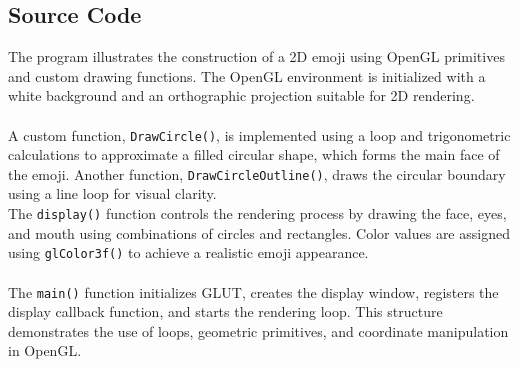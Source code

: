 \documentclass[12pt]{article}
\begin{document}
\subsection{Source Code}
The program illustrates the construction of a 2D emoji using OpenGL primitives and custom drawing functions. The OpenGL environment is initialized with a white background and an orthographic projection suitable for 2D rendering. \\ \\
A custom function, \texttt{DrawCircle()}, is implemented using a loop and trigonometric calculations to approximate a filled circular shape, which forms the main face of the emoji. Another function, \texttt{DrawCircleOutline()}, draws the circular boundary using a line loop for visual clarity. \\
The \texttt{display()} function controls the rendering process by drawing the face, eyes, and mouth using combinations of circles and rectangles. Color values are assigned using \texttt{glColor3f()} to achieve a realistic emoji appearance. \\ \\
The \texttt{main()} function initializes GLUT, creates the display window, registers the display callback function, and starts the rendering loop. This structure demonstrates the use of loops, geometric primitives, and coordinate manipulation in OpenGL. \\ \\
\newpage
{}
\end{document}
